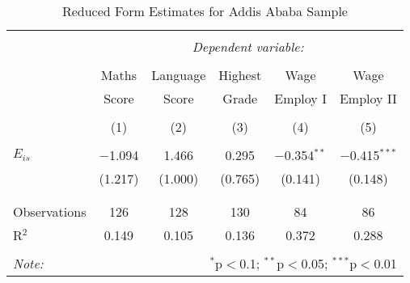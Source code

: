 

\begin{table}[!htbp] \centering 
  \caption{Reduced Form Estimates for Addis Ababa Sample} 
  \label{} 
\begin{tabular}{@{\extracolsep{5pt}}lccccc} 
\\[-1.8ex]\hline 
\hline \\[-1.8ex] 
 & \multicolumn{5}{c}{\textit{Dependent variable:}} \\ 
\cline{2-6} 
\\[-1.8ex] & Maths & Language & Highest & Wage & Wage \\ 
 & Score & Score & Grade & Employ I & Employ II \\
\\[-1.8ex] & (1) & (2) & (3) & (4) & (5)\\ 
\hline \\[-1.8ex] 
 $E_{is}$ & $-$1.094 & 1.466 & 0.295 & $-$0.354$^{**}$ & $-$0.415$^{***}$ \\ 
  & (1.217) & (1.000) & (0.765) & (0.141) & (0.148) \\ 
  & & & & & \\ 
\hline \\[-1.8ex] 
Observations & 126 & 128 & 130 & 84 & 86 \\ 
R$^{2}$ & 0.149 & 0.105 & 0.136 & 0.372 & 0.288 \\ 
\hline 
\hline \\[-1.8ex] 
\textit{Note:}  & \multicolumn{5}{r}{$^{*}$p$<$0.1; $^{**}$p$<$0.05; $^{***}$p$<$0.01} \\ 
\end{tabular} 
\end{table} 



